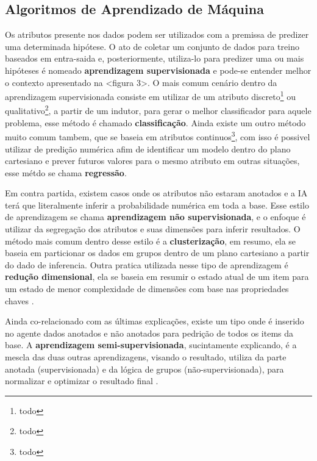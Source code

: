\subsection{Algoritmos de Aprendizado de Máquina}
Os atributos presente nos dados podem ser utilizados com a premissa de predizer uma determinada hipótese. O ato de coletar um conjunto de dados para treino baseados em entra-saida e, posteriormente, utiliza-lo para predizer uma ou mais hipóteses é nomeado \textbf{aprendizagem supervisionada} e pode-se entender melhor o contexto apresentado na <figura 3>. O mais comum cenário dentro da aprendizagem supervisionada consiste em utilizar de um atributo discreto\footnote{todo} ou qualitativo\footnote{todo}, a partir de um indutor, para gerar o melhor classificador para aquele problema, esse método é chamado \textbf{classificação}. Ainda existe um outro método muito comum tambem, que se baseia em atributos continuos\footnote{todo}, com isso é possivel utilizar de predição numérica afim de identificar um modelo dentro do plano cartesiano e prever futuros valores para o mesmo atributo em outras situações, esse métdo se chama \textbf{regressão}. \cite{hastie2009unsupervised, russell2003artificial}

Em contra partida, existem casos onde os atributos não estaram anotados e a IA terá que literalmente inferir a probabilidade numérica em toda a base. Esse estilo de aprendizagem se chama \textbf{aprendizagem não supervisionada}, e o enfoque é utilizar da segregação dos atributos e suas dimensões para inferir resultados. O método mais comum dentro desse estilo é a \textbf{clusterização}, em resumo, ela se baseia em particionar os dados em grupos dentro de um plano cartesiano a partir do dado de inferencia. Outra pratica utilizada nesse tipo de aprendizagem é \textbf{redução dimensional}, ela se baseia em resumir o estado atual de um item para um estado de menor complexidade de dimensões com base nas propriedades chaves \cite{hastie2009unsupervised, mohri2012foundations}.

Ainda co-relacionado com as últimas explicações, existe um tipo onde é inserido no agente dados anotados e não anotados para pedrição de todos os items da base. A \textbf{aprendizagem semi-supervisionada}, sucintamente explicando, é a mescla das duas outras aprendizagens, visando o resultado, utiliza da parte anotada (supervisionada) e da lógica de grupos (não-supervisionada), para normalizar e optimizar o resultado final \cite[7]{mohri2012foundations}.


